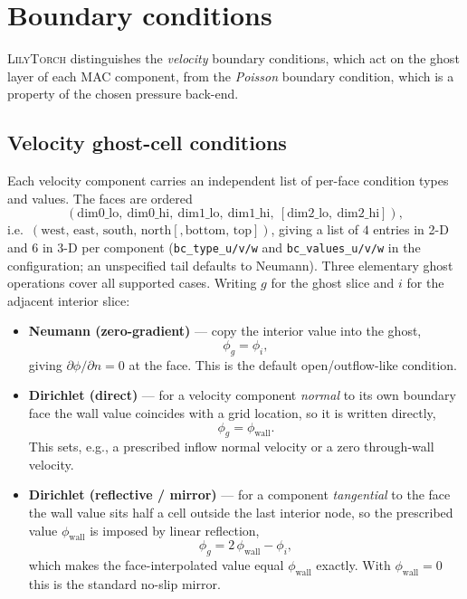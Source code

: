 \documentclass[10pt,onecolumn]{article}
\newcommand{\lilytorch}{\textsc{LilyTorch}\xspace}
\begin{document}
\section{Boundary conditions}\label{sec:s-bc}

\lilytorch distinguishes the \emph{velocity} boundary conditions, which
act on the ghost layer of each MAC component, from the \emph{Poisson}
boundary condition, which is a property of the chosen pressure back-end.

\subsection{Velocity ghost-cell conditions}

Each velocity component carries an independent list of per-face
condition types and values.  The faces are ordered
\begin{equation*}
  (\text{dim0\_lo},\ \text{dim0\_hi},\ \text{dim1\_lo},\ \text{dim1\_hi},
   \ [\text{dim2\_lo},\ \text{dim2\_hi}]),
\end{equation*}
i.e.\ $(\text{west, east, south, north}[, \text{bottom, top}])$, giving
a list of $4$ entries in 2-D and $6$ in 3-D per component
(\texttt{bc\_type\_u/v/w} and \texttt{bc\_values\_u/v/w} in the
configuration; an unspecified tail defaults to Neumann).  Three
elementary ghost operations cover all supported cases.  Writing $g$ for
the ghost slice and $i$ for the adjacent interior slice:

\begin{itemize}
\item \textbf{Neumann (zero-gradient)} — copy the interior value into
  the ghost,
  \begin{equation}
    \phi_g = \phi_i,
    \label{eq:s-neumann}
  \end{equation}
  giving $\partial\phi/\partial n = 0$ at the face.  This is the default
  open/outflow-like condition.
\item \textbf{Dirichlet (direct)} — for a velocity component
  \emph{normal} to its own boundary face the wall value coincides with a
  grid location, so it is written directly,
  \begin{equation}
    \phi_g = \phi_{\text{wall}}.
    \label{eq:s-dirichlet}
  \end{equation}
  This sets, e.g., a prescribed inflow normal velocity or a zero
  through-wall velocity.
\item \textbf{Dirichlet (reflective / mirror)} — for a component
  \emph{tangential} to the face the wall value sits half a cell outside
  the last interior node, so the prescribed value $\phi_{\text{wall}}$ is
  imposed by linear reflection,
  \begin{equation}
    \phi_g = 2\,\phi_{\text{wall}} - \phi_i,
    \label{eq:s-reflect}
  \end{equation}
  which makes the face-interpolated value equal $\phi_{\text{wall}}$
  exactly.  With $\phi_{\text{wall}}=0$ this is the standard no-slip
  mirror.
\end{itemize}
\end{document}
